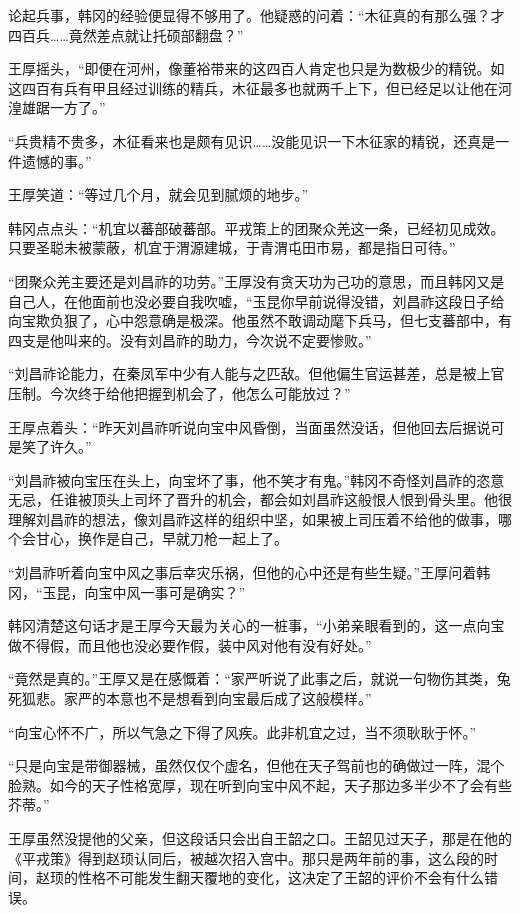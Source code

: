 论起兵事，韩冈的经验便显得不够用了。他疑惑的问着：“木征真的有那么强？才四百兵……竟然差点就让托硕部翻盘？”

王厚摇头，“即便在河州，像董裕带来的这四百人肯定也只是为数极少的精锐。如这四百有兵有甲且经过训练的精兵，木征最多也就两千上下，但已经足以让他在河湟雄踞一方了。”

“兵贵精不贵多，木征看来也是颇有见识……没能见识一下木征家的精锐，还真是一件遗憾的事。”

王厚笑道：“等过几个月，就会见到腻烦的地步。”

韩冈点点头：“机宜以蕃部破蕃部。平戎策上的团聚众羌这一条，已经初见成效。只要圣聪未被蒙蔽，机宜于渭源建城，于青渭屯田市易，都是指日可待。”

“团聚众羌主要还是刘昌祚的功劳。”王厚没有贪天功为己功的意思，而且韩冈又是自己人，在他面前也没必要自我吹嘘，“玉昆你早前说得没错，刘昌祚这段日子给向宝欺负狠了，心中怨意确是极深。他虽然不敢调动麾下兵马，但七支蕃部中，有四支是他叫来的。没有刘昌祚的助力，今次说不定要惨败。”

“刘昌祚论能力，在秦凤军中少有人能与之匹敌。但他偏生官运甚差，总是被上官压制。今次终于给他把握到机会了，他怎么可能放过？”

王厚点着头：“昨天刘昌祚听说向宝中风昏倒，当面虽然没话，但他回去后据说可是笑了许久。”

“刘昌祚被向宝压在头上，向宝坏了事，他不笑才有鬼。”韩冈不奇怪刘昌祚的恣意无忌，任谁被顶头上司坏了晋升的机会，都会如刘昌祚这般恨人恨到骨头里。他很理解刘昌祚的想法，像刘昌祚这样的组织中坚，如果被上司压着不给他的做事，哪个会甘心，换作是自己，早就刀枪一起上了。

“刘昌祚听着向宝中风之事后幸灾乐祸，但他的心中还是有些生疑。”王厚问着韩冈，“玉昆，向宝中风一事可是确实？”

韩冈清楚这句话才是王厚今天最为关心的一桩事，“小弟亲眼看到的，这一点向宝做不得假，而且他也没必要作假，装中风对他有没有好处。”

“竟然是真的。”王厚又是在感慨着：“家严听说了此事之后，就说一句物伤其类，兔死狐悲。家严的本意也不是想看到向宝最后成了这般模样。”

“向宝心怀不广，所以气急之下得了风疾。此非机宜之过，当不须耿耿于怀。”

“只是向宝是带御器械，虽然仅仅个虚名，但他在天子驾前也的确做过一阵，混个脸熟。如今的天子性格宽厚，现在听到向宝中风不起，天子那边多半少不了会有些芥蒂。”

王厚虽然没提他的父亲，但这段话只会出自王韶之口。王韶见过天子，那是在他的《平戎策》得到赵顼认同后，被越次招入宫中。那只是两年前的事，这么段的时间，赵顼的性格不可能发生翻天覆地的变化，这决定了王韶的评价不会有什么错误。

